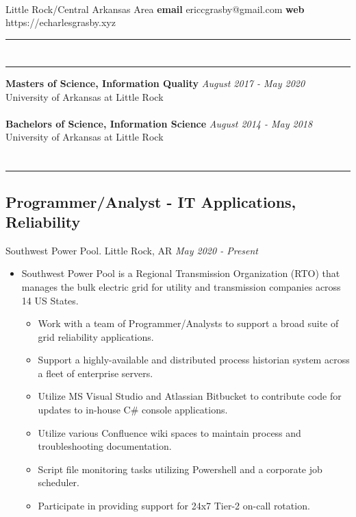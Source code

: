 \documentclass[11pt]{article}
\author{Eric Charles Grasby}
\newcommand{\ualr}{University of Arkansas at Little Rock}
\newcommand{\uppr}[3]{ \noindent\MakeUppercase{{\fontsize{#2}{#3} \selectfont {#1}}} }
\begin{document}
\begin{center}
\uppr{\textbf{Eric Charles Grasby}}{24}{28} \\
\vspace{20px}
Little Rock/Central Arkansas Area \hfill \textbf{email} ericcgrasby@gmail.com \hfill \textbf{web} https://echarlesgrasby.xyz
\noindent \rule{1.0\textwidth}{0.4pt}
\end{center}

\section*{\uppr{Education}{14}{16}} \noindent \rule{1.0\textwidth}{0.4pt}
\textbf{Masters of Science, Information Quality} \hfill \textit{August 2017 - May 2020} \\
\ualr \\ \\
\textbf{Bachelors of Science, Information Science} \hfill \textit{August 2014 - May 2018} \\
\ualr

\section*{\uppr{Work Experience}{14}{16}} \noindent \rule{1.0\textwidth}{0.4pt}
\subsection*{Programmer/Analyst - IT Applications, Reliability}
Southwest Power Pool. Little Rock, AR \hfill \textit{May 2020 - Present} \\
\begin{itemize}
	\item Southwest Power Pool is a Regional Transmission Organization (RTO) that manages the bulk electric grid for utility and transmission companies across 14 US States.
 \begin{itemize}
  \item Work with a team of Programmer/Analysts to support a broad suite of grid reliability applications.
  \item Support a highly-available and distributed process historian system across a fleet of enterprise servers.
  \item Utilize MS Visual Studio and Atlassian Bitbucket to contribute code for updates to in-house C\# console applications.
  \item Utilize various Confluence wiki spaces to maintain process and troubleshooting documentation.
  \item Script file monitoring tasks utilizing Powershell and a corporate job scheduler.
  \item Participate in providing support for 24x7 Tier-2 on-call rotation.
 \end{itemize}
\end{itemize}
\\
\end{document}
